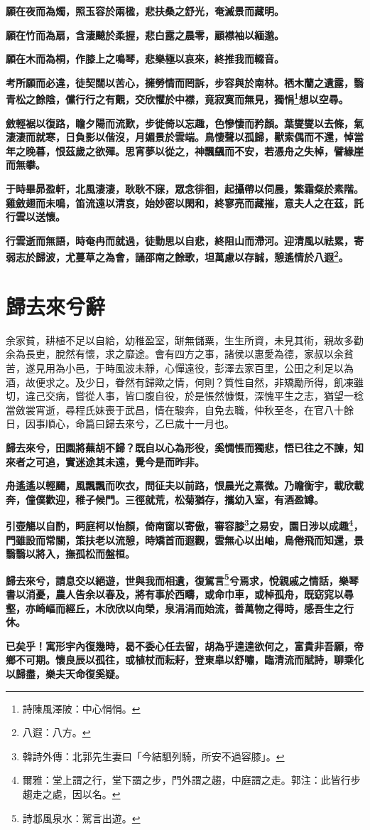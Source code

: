 \textbf{願在夜而為燭，照玉容於兩楹，悲扶桑之舒光，奄滅景而藏明。}

\textbf{願在竹而為扇，含淒飇於柔握，悲白露之晨零，顧襟袖以緬邈。}

\textbf{願在木而為桐，作膝上之鳴琴，悲樂極以哀來，終推我而輟音。}

\textbf{考所願而必違，徒契闊以苦心，擁勞情而罔訴，步容與於南林。栖木蘭之遺露，翳青松之餘陰，儻行行之有覿，交欣懼於中襟，竟寂寞而無見，獨悁\footnote{詩陳風澤陂：中心悁悁。}想以空尋。}

\textbf{斂輕裾以復路，瞻夕陽而流歎，步徙倚以忘趣，色慘悽而矜顏。葉燮燮以去條，氣淒淒而就寒，日負影以偕沒，月媚景於雲端。鳥悽聲以孤歸，獸索偶而不還，悼當年之晚暮，恨茲歲之欲殫。思宵夢以從之，神飄颻而不安，若憑舟之失棹，譬緣崖而無攀。}

\textbf{于時畢昴盈軒，北風淒淒，耿耿不寐，眾念徘徊，起攝帶以伺晨，繁霜粲於素階。雞斂翅而未鳴，笛流遠以清哀，始妙密以閑和，終寥亮而藏摧，意夫人之在茲，託行雲以送懷。}

\textbf{行雲逝而無語，時奄冉而就過，徒勤思以自悲，終阻山而滯河。迎清風以祛累，寄弱志於歸波，尤蔓草之為會，誦邵南之餘歌，坦萬慮以存誠，憩遙情於八遐\footnote{八遐：八方。}。}

\section{歸去來兮辭\hspace{1ex}{\footnotesize 并序}}

\begin{quoting}余家貧，耕植不足以自給，幼稚盈室，缾無儲粟，生生所資，未見其術，親故多勸余為長吏，脫然有懷，求之靡途。會有四方之事，諸侯以惠愛為德，家叔以余貧苦，遂見用為小邑，于時風波未靜，心憚遠役，彭澤去家百里，公田之利足以為酒，故便求之。及少日，眷然有歸歟之情，何則？質性自然，非矯勵所得，飢凍雖切，違己交病，嘗從人事，皆口腹自役，於是悵然慷慨，深愧平生之志，猶望一稔當斂裳宵逝，尋程氏妹喪于武昌，情在駿奔，自免去職，仲秋至冬，在官八十餘日，因事順心，命篇曰歸去來兮，乙巳歲十一月也。\end{quoting}

\textbf{歸去來兮，田園將蕪胡不歸？既自以心為形役，奚惆悵而獨悲，悟已往之不諫，知來者之可追，實迷途其未遠，覺今是而昨非。}

\textbf{舟遙遙以輕颺，風飄飄而吹衣，問征夫以前路，恨晨光之熹微。乃瞻衡宇，載欣載奔，僮僕歡迎，稚子候門。三徑就荒，松菊猶存，攜幼入室，有酒盈罇。}

\textbf{引壺觴以自酌，眄庭柯以怡顏，倚南窗以寄傲，審容膝\footnote{韓詩外傳：北郭先生妻曰「今結駟列騎，所安不過容膝」。}之易安，園日涉以成趣\footnote{爾雅：堂上謂之行，堂下謂之步，門外謂之趨，中庭謂之走。郭注：此皆行步趨走之處，因以名。}，門雖設而常關，策扶老以流憩，時矯首而遐觀，雲無心以出岫，鳥倦飛而知還，景翳翳以將入，撫孤松而盤桓。}

\textbf{歸去來兮，請息交以絕遊，世與我而相遺，復駕言\footnote{詩邶風泉水：駕言出遊。}兮焉求，悅親戚之情話，樂琴書以消憂，農人告余以春及，將有事於西疇，或命巾車，或棹孤舟，既窈窕以尋壑，亦崎嶇而經丘，木欣欣以向榮，泉涓涓而始流，善萬物之得時，感吾生之行休。}

\textbf{已矣乎！寓形宇內復幾時，曷不委心任去留，胡為乎遑遑欲何之，富貴非吾願，帝鄉不可期。懷良辰以孤往，或植杖而耘耔，登東皐以舒嘯，臨清流而賦詩，聊乘化以歸盡，樂夫天命復奚疑。}

